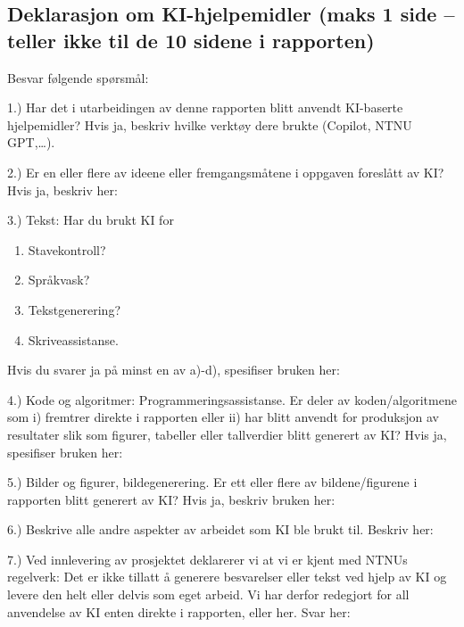 \subsection{Deklarasjon om KI-hjelpemidler (maks 1 side -- teller ikke til de 10 sidene i rapporten)}\label{deklarasjon-om-ki-hjelpemidler-maks-1-side-teller-ikke-til-de-10-sidene-i-rapporten}

Besvar følgende spørsmål:

1.) Har det i utarbeidingen av denne rapporten blitt anvendt KI-baserte
hjelpemidler? Hvis ja, beskriv hvilke verktøy dere brukte (Copilot, NTNU
GPT,\ldots).

2.) Er en eller flere av ideene eller fremgangsmåtene i oppgaven
foreslått av KI? Hvis ja, beskriv her:

3.) Tekst: Har du brukt KI for
\begin{enumerate}
\def\labelenumi{\alph{enumi})}
\tightlist
\item Stavekontroll?
\item Språkvask?
\item Tekstgenerering?
\item Skriveassistanse.
\end{enumerate}

Hvis du svarer ja på minst en av a)-d), spesifiser bruken her:

4.) Kode og algoritmer: Programmeringsassistanse. Er deler av
koden/algoritmene som i) fremtrer direkte i rapporten eller ii) har
blitt anvendt for produksjon av resultater slik som figurer, tabeller
eller tallverdier blitt generert av KI? Hvis ja, spesifiser bruken her:

5.) Bilder og figurer, bildegenerering. Er ett eller flere av
bildene/figurene i rapporten blitt generert av KI? Hvis ja, beskriv
bruken her:

6.) Beskrive alle andre aspekter av arbeidet som KI ble brukt til.
Beskriv her:

7.) Ved innlevering av prosjektet deklarerer vi at vi er kjent med NTNUs
regelverk: Det er ikke tillatt å generere besvarelser eller tekst ved
hjelp av KI og levere den helt eller delvis som eget arbeid. Vi har
derfor redegjort for all anvendelse av KI enten direkte i rapporten,
eller her. Svar her:
